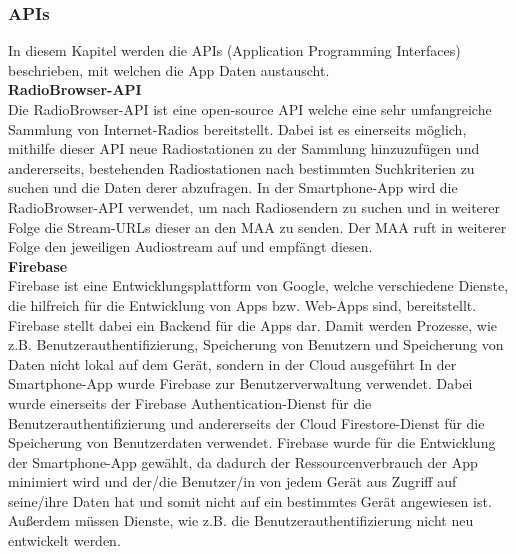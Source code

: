 \documentclass[11pt, twoside]{article}
\begin{document}
\subsubsection{APIs}
In diesem Kapitel werden die APIs (Application Programming Interfaces) beschrieben, mit welchen die App Daten austauscht. \newline \\
\textbf{RadioBrowser-API}\\
Die RadioBrowser-API ist eine open-source API welche eine sehr umfangreiche Sammlung von Internet-Radios bereitstellt. Dabei ist es einerseits möglich, mithilfe dieser API neue Radiostationen zu der Sammlung hinzuzufügen und andererseits, bestehenden Radiostationen nach bestimmten Suchkriterien zu suchen und die Daten derer abzufragen. \parencite[vgl.][]{noauthor_urlpi21_nodate} \newline
In der Smartphone-App wird die RadioBrowser-API verwendet, um nach Radiosendern zu suchen und in weiterer Folge die Stream-URLs dieser an den MAA zu senden. Der MAA ruft in weiterer Folge den jeweiligen Audiostream auf und empfängt diesen. \newline \\
\textbf{Firebase}\\
Firebase ist eine Entwicklungsplattform von Google, welche verschiedene Dienste, die hilfreich für die Entwicklung von Apps bzw. Web-Apps sind, bereitstellt. Firebase stellt dabei ein Backend für die Apps dar. Damit werden Prozesse, wie z.B. Benutzerauthentifizierung, Speicherung von Benutzern und Speicherung von Daten nicht lokal auf dem Gerät, sondern in der Cloud ausgeführt \parencite[vgl.][]{noauthor_urlpi22_nodate} \newline
In der Smartphone-App wurde Firebase zur Benutzerverwaltung verwendet. Dabei wurde einerseits der \glqq Firebase Authentication\grqq{}-Dienst für die Benutzerauthentifizierung und andererseits der \glqq Cloud Firestore\grqq{}-Dienst für die Speicherung von Benutzerdaten verwendet. Firebase wurde für die Entwicklung der Smartphone-App gewählt, da dadurch der Ressourcenverbrauch der App minimiert wird und der/die Benutzer/in von jedem Gerät aus Zugriff auf seine/ihre Daten hat und somit nicht auf ein bestimmtes Gerät angewiesen ist. Außerdem müssen Dienste, wie z.B. die Benutzerauthentifizierung nicht neu entwickelt werden.
\end{document}
